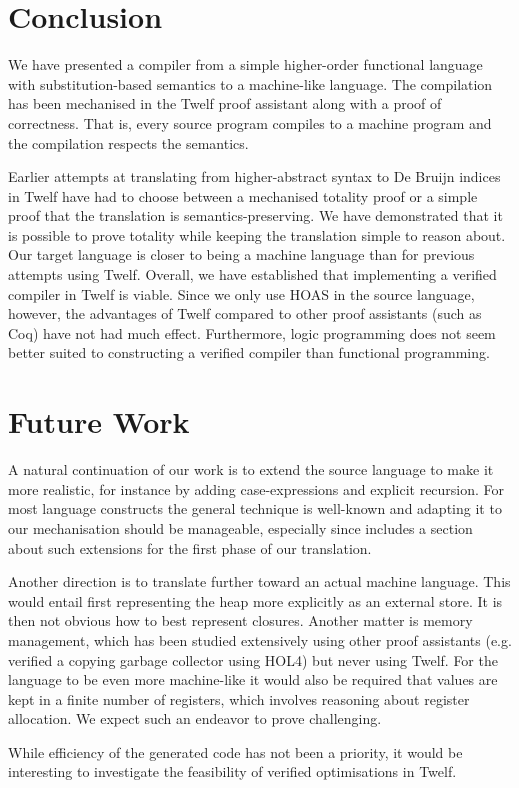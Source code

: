 \section{Conclusion}

We have presented a compiler from a simple higher-order functional language with substitution-based semantics to a machine-like language.
The compilation has been mechanised in the Twelf proof assistant along with a proof of correctness.
That is, every source program compiles to a machine program and the compilation respects the semantics.

Earlier attempts at translating from higher-abstract syntax to De Bruijn indices in Twelf have had to choose between a mechanised totality proof or a simple proof that the translation is semantics-preserving.
We have demonstrated that it is possible to prove totality while keeping the translation simple to reason about.
Our target language is closer to being a machine language than for previous attempts using Twelf.
Overall, we have established that implementing a verified compiler in Twelf is viable.
Since we only use HOAS in the source language, however, the advantages of Twelf compared to other proof assistants (such as Coq) have not had much effect.
Furthermore, logic programming does not seem better suited to constructing a verified compiler than functional programming.


\section{Future Work}

A natural continuation of our work is to extend the source language to make it more realistic, for instance by adding case-expressions and explicit recursion.
For most language constructs the general technique is well-known and adapting it to our mechanisation should be manageable, especially since \cite{Pfenning01} includes a section about such extensions for the first phase of our translation.

Another direction is to translate further toward an actual machine language.
This would entail first representing the heap more explicitly as an external store.
It is then not obvious how to best represent closures.
Another matter is memory management, which has been studied extensively using other proof assistants (e.g. \cite{Myreen10} verified a copying garbage collector using HOL4) but never using Twelf.
For the language to be even more machine-like it would also be required that values are kept in a finite number of registers, which involves reasoning about register allocation.
We expect such an endeavor to prove challenging.

While efficiency of the generated code has not been a priority, it would be interesting to investigate the feasibility of verified optimisations in Twelf.
